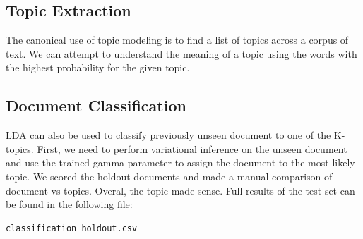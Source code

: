 \documentclass[11pt]{article}
\begin{document}
\subsection{Topic Extraction}
The canonical use of topic modeling is to find a list of topics across a corpus of text. We can attempt to understand the meaning of a topic using the words with the highest probability for the given topic. %
\begin{table}[h]
\caption{Topic Sample from LDA model: each column represents the top 10 words from the topic. We can see that the topics are easy to interpret. for full list of topic, see: }%

\end{table}

\subsection{Document Classification}
LDA can also be used to classify previously unseen document to one of the K-topics. First, we need to perform variational inference on the unseen document and use the trained gamma parameter to assign the document to the most likely topic. We scored the holdout documents and made a manual comparison of document vs topics. Overal, the topic made sense. Full results of the test set can be found in the following file: \begin{verbatim}
classification_holdout.csv 
\end{verbatim}
\end{document}
